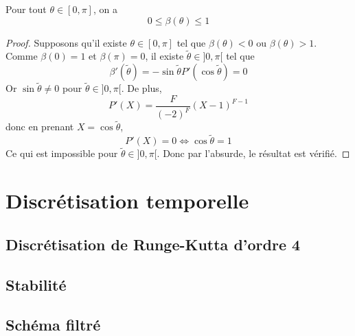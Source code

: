 \begin{proposition}
Pour tout $\theta \in [0, \pi]$, on a 
\begin{equation}
0 \leq \beta ( \theta ) \leq 1
\end{equation}
\end{proposition}

\begin{proof}
Supposons qu'il existe $\theta \in [0, \pi]$ tel que $\beta(\theta) < 0$ ou $\beta(\theta) > 1$. Comme $\beta(0)=1$ et $\beta(\pi) = 0$, il existe $\tilde{\theta} \in ]0, \pi[$ tel que 
\begin{equation}
\beta'(\tilde{\theta}) = - \sin \tilde{\theta} P'(\cos \tilde{\theta} ) = 0
\end{equation}
Or $\sin \tilde{\theta} \neq 0$ pour $\tilde{\theta} \in ]0, \pi[$.
De plus, 
\begin{equation}
P'(X) = \dfrac{F}{(-2)^F}(X-1)^{F-1}
\end{equation}
donc en prenant $X = \cos \tilde{\theta}$,
\begin{equation*}
P'(X) = 0 \Leftrightarrow \cos \tilde{\theta} = 1
\end{equation*}
Ce qui est impossible pour $\tilde{\theta} \in ]0, \pi[$. Donc par l'absurde, le résultat est vérifié.
\end{proof}












\section{Discrétisation temporelle}

\subsection{Discrétisation de Runge-Kutta d'ordre 4}

\subsection{Stabilité}

\subsection{Schéma filtré}















